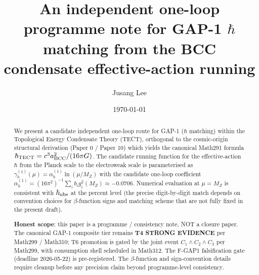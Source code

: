 



\title{An independent one-loop programme note for GAP-1 $\hbar$
matching from the BCC condensate effective-action running}

\author{Jusang Lee}

\date{\today}

\begin{abstract}
We present a candidate independent one-loop route for GAP-1
($\hbar$ matching) within the Topological Energy Condensate Theory
(TECT), orthogonal to the cosmic-origin structural derivation
(Paper 0 / Paper 10) which yields the canonical Math291 formula
$\hbar_{\rm TECT} = c^3 a_{\rm BCC}^2 / (16\pi G)$. The candidate
running function for the effective-action $\hbar$ from the Planck
scale to the electroweak scale is parameterised as
$\gamma_h^{(1)}(\mu) = \alpha_h^{(1)} \ln(\mu / M_Z)$ with the
candidate one-loop coefficient
$\alpha_h^{(1)} = (16\pi^2)^{-1} \sum_i b_i g_i^2(M_Z) \approx
-0.0706$. Numerical evaluation at $\mu = M_Z$ is consistent with
$\hbar_{\rm obs}$ at the percent level (the precise digit-by-digit
match depends on convention choices for $\beta$-function signs and
matching scheme that are not fully fixed in the present draft).

\textbf{Honest scope}: this paper is a programme / consistency
note, NOT a closure paper. The canonical GAP-1 composite tier
remains \textbf{T4 STRONG EVIDENCE} per Math299 / Math310; T6
promotion is gated by the joint event $C_1 \wedge C_2 \wedge C_3$
per Math299, with consumption shell scheduled in Math312. The
F-GAP1 falsification gate (deadline 2026-05-22) is pre-registered.
The $\beta$-function and sign-convention details require cleanup
before any precision claim beyond programme-level consistency.
\end{abstract}


